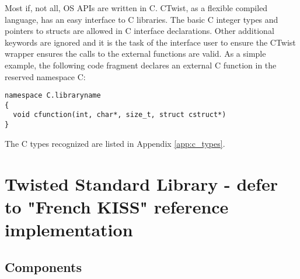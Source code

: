\documentclass[a4paper,11pt]{article}
\begin{document}
Most if, not all, OS APIs are written in C.
CTwist, as a flexible compiled language, has an easy interface to C libraries.
The basic C integer types and pointers to structs are allowed in C interface declarations.
Other additional keywords are ignored and it is the task of the interface user to ensure the CTwist wrapper ensures the calls to the external functions are valid.
As a simple example, the following code fragment declares an external C function in the reserved namespace C:
\begin{lstlisting}
namespace C.libraryname
{
  void cfunction(int, char*, size_t, struct cstruct*)
}
\end{lstlisting}
The C types recognized are listed in Appendix \ref{app:c_types}.

\section{Twisted Standard Library -  defer to "French KISS" reference implementation}
  \subsection{Components}
\end{document}

